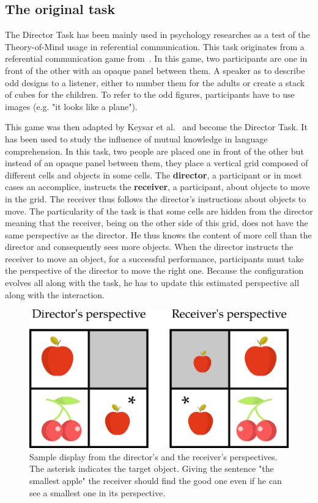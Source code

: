 \subsection{The original task}

The Director Task has been mainly used in psychology researches as a test of the Theory-of-Mind usage in referential communication. This task originates from a referential communication game from~\cite{krauss_1977_social}. In this game, two participants are one in front of the other with an opaque panel between them. A speaker as to describe odd designs to a listener, either to number them for the adults or create a stack of cubes for the children. To refer to the odd figures, participants have to use images (e.g. "it looks like a plane").

This game was then adapted by Keysar et al.~\cite{keysar_2000_taking} and become the Director Task. It has been used to study the influence of mutual knowledge in language comprehension. In this task, two people are placed one in front of the other but instead of an opaque panel between them, they place a vertical grid composed of different cells and objects in some cells. The \textbf{director}, a participant or in most cases an accomplice, instructs the \textbf{receiver}, a participant, about objects to move in the grid. The receiver thus follows the director's instructions about objects to move. The particularity of the task is that some cells are hidden from the director meaning that the receiver, being on the other side of this grid, does not have the same perspective as the director. He thus knows the content of more cell than the director and consequently sees more objects. When the director instructs the receiver to move an object, for a successful performance, participants must take the perspective of the director to move the right one. Because the configuration evolves all along with the task, he has to update this estimated perspective all along with the interaction.

\begin{figure}[ht!]
\centering
\includegraphics[scale=0.25]{figures/chapter9/dt_apple.png}
\caption{\label{fig:chap9_dt_apple} Sample display from the director's and the receiver's perspectives. The asterisk indicates the target object. Giving the sentence "the smallest apple" the receiver should find the good one even if he can see a smallest one in its perspective. }
\end{figure}

